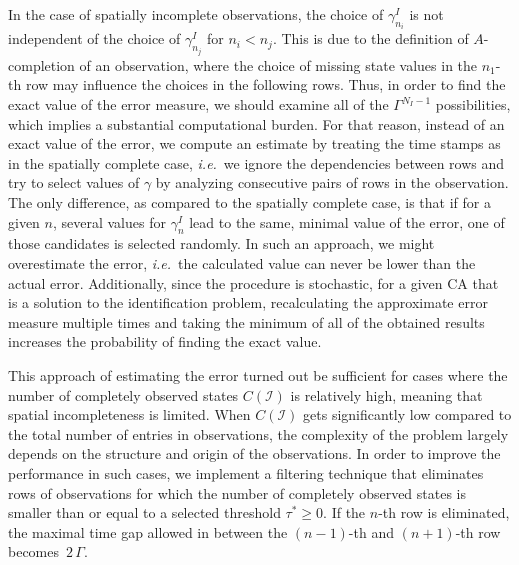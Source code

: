 In the case of spatially incomplete observations, the choice of $\gamma^I_{n_i}$ is not independent of the choice of $\gamma^I_{n_j}$ for $n_i < n_j$. This is due to the definition of $A$-completion of an observation, where the choice of missing state values in the $n_1$-th row may influence the choices in the following rows. Thus, in order to find the exact value of the error measure, we should examine all of the $\Gamma^{N_I-1}$ possibilities, which implies a substantial computational burden. For that reason, instead of an exact value of the error, we compute an estimate by treating the time stamps as in the spatially complete case, \emph{i.e.}\ we ignore the dependencies between rows and try to select values of $\gamma$ by analyzing consecutive pairs of rows in the observation. The only difference, as compared to the spatially complete case, is that if for a given $n$, several values for $\gamma^I_n$ lead to the same, minimal value of the error, one of those candidates is selected randomly. In such an approach, we might overestimate the error, \emph{i.e.}\ the calculated value can never be lower than the actual error. Additionally, since the procedure is stochastic, for a given CA that is a solution to the identification problem, recalculating the approximate error measure multiple times and taking the minimum of all of the obtained results increases the probability of finding the exact value.

This approach of estimating the error turned out be sufficient for cases where the number of completely observed states $C(\mathcal{I})$ is relatively high, meaning that spatial incompleteness is limited.
When $C(\mathcal{I})$ gets significantly low compared to the total number of entries in observations, the complexity of the problem largely depends on the structure and origin of the observations. In order to improve the performance in such cases, we implement a filtering technique that eliminates rows of observations for which the number of completely observed states is smaller than or equal to a selected threshold $\tau^\ast\geq 0$. If the $n$-th row is eliminated, the maximal time gap allowed in between the $(n-1)$-th and $(n+1)$-th row becomes~$2\,\Gamma$.